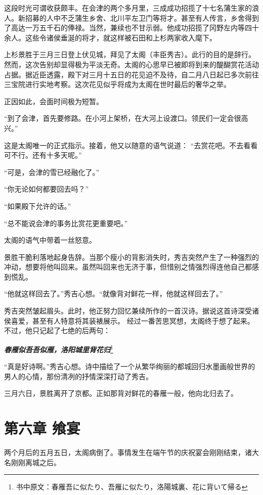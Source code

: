 \documentclass[
]{book}
\begin{document}
这段时光可谓收获颇丰。在会津的两个多月里，三成成功招揽了十七名蒲生家的浪人。新招募的人中不乏蒲生乡舍、北川平左卫门等将才。甚至有人传言，乡舍得到了高达一万五千石的俸禄。当然，兼续也不甘示弱。他成功招揽了冈野左内等四十余人。这些令诸侯垂涎的将才，就这样被石田和上杉两家收入麾下。

上杉景胜于三月三日登上伏见城，拜见了太阁（丰臣秀吉）。此行的目的是辞行。然而，这次告别却显得极为平淡无奇。太阁的心思早已被即将到来的醍醐赏花活动占据。据近臣透露，殿下对三月十五日的花见迫不及待，自二月八日起已多次前往三宝院进行实地考察。这次花见似乎将成为太阁在世时最后的奢华之举。

正因如此，会面时间极为短暂。

``到了会津，首先要修路。在小河上架桥，在大河上设渡口。领民们一定会很高兴。''

这是太阁唯一的正式指示。接着，他又以随意的语气说道：
``去赏花吧。不去看看可不行。还有十多天呢。''

``可是，会津的雪已经融化了。''

``你无论如何都要回去吗？''

``如果殿下允许的话。''

``总不能说会津的事务比赏花更重要吧。''

太阁的语气中带着一丝怒意。

景胜干脆利落地起身告辞。当那个瘦小的背影消失时，秀吉突然产生了一种强烈的冲动，想要将他叫回来。虽然叫回来也无济于事，但惜别之情强烈得连他自己都感到慌乱。

``他就这样回去了。''秀吉心想。``就像背对鲜花一样，他就这样回去了。''

秀吉突然皱起眉头。此时，他正努力回忆兼续所作的一首汉诗。据说这首诗深受诸侯喜爱，甚至有人特意将其装裱展示。
经过一番苦思冥想，太阁终于想了起来。不过，他只记起了七绝的后两句：

\textbf{\emph{春雁似吾吾似雁，洛阳城里背花归}}\footnote{书中原文：春雁吾に似たり、吾雁に似たり，洛陽城裏、花に背いて帰る}

``真是好诗啊。''秀吉心想。诗中描绘了一个从繁华绚丽的都城回归水墨画般世界的男人的心情，那份清冽的抒情深深打动了秀吉。

三月六日，景胜离开了京都。正如那背对鲜花的春雁一般，他向北归去了。

\chapter*{第六章 飨宴}\label{ux7b2cux516dux7ae0-ux98e8ux5bb4}

两个月后的五月五日，太阁病倒了。事情发生在端午节的庆祝宴会刚刚结束，诸大名刚刚离城之后。
\end{document}
